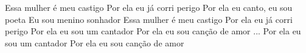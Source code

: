\beginchorus
Essa mulher é meu castigo
Por ela eu já corri perigo
Por ela eu canto, eu sou poeta
Eu sou menino sonhador
Essa mulher é meu castigo
Por ela eu já corri perigo
Por ela eu sou um cantador
Por ela eu sou canção de amor
\endchorus
{}
\beginverse
... Por ela eu sou um cantador
Por ela eu sou canção de amor
\endverse
{}
\vspace{4em} %
\begin{comment}
\lstset{basicstyle=\scriptsize\bf} %
\tab{Solo 1}
\begin{lstlisting}
E|-----------------------------------------------------|
B|-----------------------------------------------------|
G|-----------------------------------------------------|
D|-----------------------------------------------------|
A|-----------------------------------------------------|
E|-----------------------------------------------------|
\end{lstlisting}
\end{comment}
\begin{comment}

\color{drawChord}\gtab{\color{nameChord} X}{}%
\color{drawChord}\gtab{\color{nameChord} X}{}%
\color{drawChord}\gtab{\color{nameChord} X}{}%
\color{drawChord}\gtab{\color{nameChord} X}{}%

\end{comment}
\endsong
